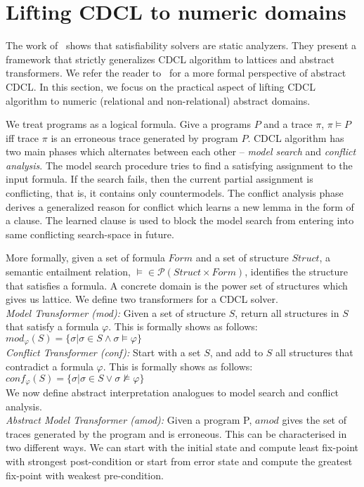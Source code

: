 \section{Lifting CDCL to numeric domains}
The work of~\cite{dhk2013-popl,sas12,tacas12} shows that 
satisfiability solvers are static analyzers. They present 
a framework that strictly generalizes CDCL algorithm to 
lattices and abstract transformers. We refer the reader 
to~\cite{dhk2013-popl} for a more formal perspective of 
abstract CDCL.  In this section, we focus on the practical 
aspect of lifting CDCL algorithm to numeric (relational and 
non-relational) abstract domains.   

We treat programs as a logical formula. Give a programs $P$ and a trace $\pi$,
$\pi \models P$ iff trace $\pi$ is an erroneous trace generated by program
$P$. 
CDCL algorithm has two main phases which alternates between each 
other -- {\em model search} and {\em conflict analysis}. The model 
search procedure tries to find a satisfying assignment to the input 
formula. If the search fails, then the current partial assignment is 
conflicting, that is, it contains only countermodels.  The conflict 
analysis phase derives a generalized reason for conflict which learns a new 
lemma in the form of a clause. The learned clause is used to block the 
model search from entering into same conflicting search-space in future. 

More formally, given a set of formula $Form$ and a set of structure $Struct$, a semantic entailment relation, $\models \in \mathcal{P}(Struct \times Form)$, identifies the structure that satisfies a formula. A concrete domain is the power set of structures which gives us lattice. 
We define two transformers for a CDCL solver. \\
\textit{Model Transformer (mod):} Given a set of structure $S$, return all structures 
in $S$ that satisfy a formula $\varphi$. This is formally shows as follows:
$mod_{\varphi}(S) = \{\sigma | \sigma \in S \wedge \sigma \models \varphi\}$ \\

\textit{Conflict Transformer (conf):} Start with a set $S$, and add to $S$ all structures 
that contradict a formula $\varphi$. This is formally shows as follows:
$conf_{\varphi}(S) = \{\sigma | \sigma \in S \vee \sigma \not\models \varphi\}$
\\
We now define abstract interpretation analogues to model search and conflict analysis.   \\
\textit{Abstract Model Transformer (amod):} Given a program P, $amod$ gives the 
set of traces generated by the program and is erroneous. This can be
characterised in two different ways. We can start with the initial state and
compute least fix-point with strongest post-condition or start from error state 
and compute the greatest fix-point with weakest pre-condition. \\

